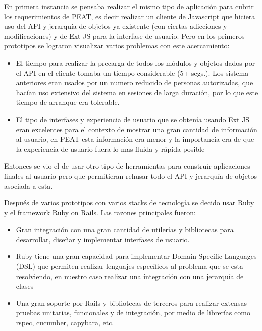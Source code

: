 \documentclass{book}
\begin{document}
En primera instancia se pensaba realizar el mismo tipo de aplicación
para cubrir los requerimientos de PEAT, es decir realizar un cliente
de Javascript que hiciera uso del API y jerarquía de objetos ya
existente (con ciertas adicciones y modificaciones) y de Ext JS
para la interfase de usuario. Pero en los primeros prototipos se
lograron visualizar varios problemas con este acercamiento:

\begin{itemize}
\item El tiempo para realizar la precarga de todos los módulos y
  objetos dados por el API en el cliente tomaba un tiempo
  considerable (5+ segs.). Los sistema anteriores eran usados
  por un numero reducido de personas autorizadas, que hacían uso
  extensivo del sistema en sesiones de larga duración, por lo
  que este tiempo de arranque era tolerable.
\item El tipo de interfases y experiencia de usuario que se obtenía
  usando Ext JS eran excelentes para el contexto de mostrar una gran
  cantidad de información al usuario, en PEAT esta información era menor
  y la importancia era de que la experiencia de usuario fuera lo mas fluida y
  rápida posible
\end{itemize}

Entonces se vio el de usar otro tipo de herramientas para construir
aplicaciones finales al usuario pero que permitieran rehusar todo el API
y jerarquía de objetos asociada a esta.

Después de varios prototipos con varios stacks de tecnología se decido
usar Ruby y el framework Ruby on Rails.
Las razones principales fueron:
\begin{itemize}
\item Gran integración con una gran cantidad de utilerías y bibliotecas para
  desarrollar, diseñar y implementar interfases de usuario.
\item Ruby tiene una gran capacidad para implementar Domain Specific Languages (DSL)
  que permiten realizar lenguajes específicos al problema que se esta resolviendo,
  en nuestro caso realizar una integración con una jerarquía de clases
\item Una gran soporte por Rails y bibliotecas de terceros para
  realizar extensas pruebas unitarias, funcionales y de integración,
  por medio de librerías como rspec, cucumber, capybara, etc.
\end{itemize}
\end{document}
